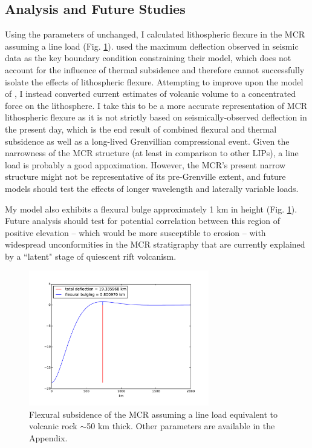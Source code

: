 \documentclass[12pt,letterpaper]{article}
\begin{document}
\subsection*{Analysis and Future Studies}

Using the parameters of \cite{Nyquist1988a} unchanged, I calculated lithospheric flexure in the MCR assuming a line load (Fig. \ref{fig:flex_sub}). \cite{Nyquist1988a} used the maximum deflection observed in seismic data as the key boundary condition constraining their model, which does not account for the influence of thermal subsidence and therefore cannot successfully isolate the effects of lithospheric flexure. Attempting to improve upon the model of \cite{Nyquist1988a}, I instead converted current estimates of volcanic volume to a concentrated force on the lithosphere. I take this to be a more accurate representation of MCR lithospheric flexure as it is not strictly based on seismically-observed deflection in the present day, which is the end result of combined flexural and thermal subsidence as well as a long-lived Grenvillian compressional event. Given the narrowness of the MCR structure (at least in comparison to other LIPs), a line load is probably a good appoximation. However, the MCR's present narrow structure might not be representative of its pre-Grenville extent, and future models should test the effects of longer wavelength and laterally variable loads.\par

My model also exhibits a flexural bulge approximately 1 km in height (Fig. \ref{fig:flex_sub}). Future analysis should test for potential correlation between this region of positive elevation -- which would be more susceptible to erosion -- with widespread unconformities in the MCR stratigraphy that are currently explained by a ``latent" stage of quiescent rift volcanism.


\begin{figure}
\noindent\includegraphics[width=0.7\textwidth]{figures/flex_fig.pdf}
\caption{\footnotesize{Flexural subsidence of the MCR assuming a line load equivalent to volcanic rock $\sim$50 km thick. Other parameters are available in the Appendix.}}
\label{fig:flex_sub}
\end{figure}
\end{document}
